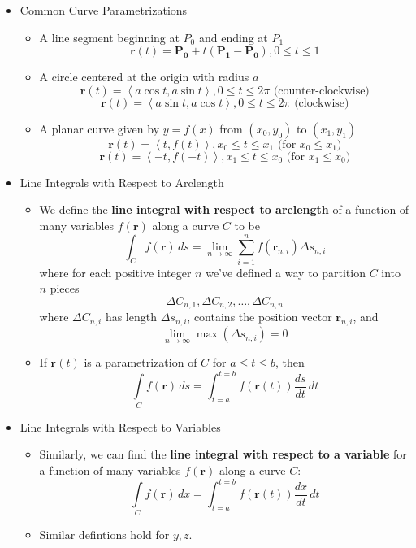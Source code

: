 \documentclass[12pt]{article}
\renewcommand{\vec}[1]{\mathbf{#1}}
\newcommand{\dvar}[1]{\,d{#1}}
\renewcommand{\d}[1]{\dvar{#1}}
\newcommand{\<}{\left<}
\renewcommand{\>}{\right>}
\begin{document}
  \begin{itemize}

  \item Common Curve Parametrizations

    \begin{itemize}
      \item A line segment beginning at $P_0$ and ending at $P_1$
        \[
          \vec{r}(t) = \vec{P_0} + t(\vec{P_1}-\vec{P_0}), 0\leq t\leq 1
        \]
      \item A circle centered at the origin with radius $a$
        \[
          \vec{r}(t) = \<a\cos t,a\sin t\>, 0\leq t\leq 2\pi \text{ (counter-clockwise)}
        \]
        \[
          \vec{r}(t) = \<a\sin t,a\cos t\>, 0\leq t\leq 2\pi \text{ (clockwise)}
        \]
      \item A planar curve given by $y=f(x)$ from $(x_0,y_0)$ to $(x_1,y_1)$
        \[
          \vec{r}(t) = \<t,f(t)\>, x_0\leq t\leq x_1 \text{ (for } x_0\leq x_1 \text{)}
        \]
        \[
          \vec{r}(t) = \<-t,f(-t)\>, x_1\leq t\leq x_0 \text{ (for } x_1\leq x_0 \text{)}
        \]
    \end{itemize}
  
  \item Line Integrals with Respect to Arclength
  
    \begin{itemize}
    \item We define the \textbf{line integral with respect to arclength} of a function of many variables $f(\vec{r})$ along a curve $C$ to be 
      \[
        \int_C f(\vec{r})\d{s} = \lim_{n\to\infty}\sum_{i=1}^n f(\vec{r}_{n,i})\Delta s_{n,i}
      \]
    where for each positive integer $n$ we've defined a way to partition $C$ into $n$ pieces 
      \[
        \Delta C_{n,1},\Delta C_{n,2},\dots,\Delta C_{n,n}
      \]
    where $\Delta C_{n,i}$ has length $\Delta s_{n,i}$, contains the position vector $\vec{r}_{n,i}$, and \[\lim_{n\to\infty} \max(\Delta s_{n,i}) = 0\]
    \item If $\vec{r}(t)$ is a parametrization of $C$ for $a \leq t \leq b$, then 
      \[
        \int\limits_C f(\vec{r})\dvar{s}=\int_{t=a}^{t=b} f(\vec{r}(t))\frac{ds}{dt}\d{t}
      \]
    \end{itemize}

  \newpage

  \item Line Integrals with Respect to Variables

    \begin{itemize}
    \item Similarly, we can find the \textbf{line integral with respect to a variable} for a function of many variables $f(\vec{r})$ along a curve $C$:
      \[
        \int\limits_C f(\vec{r})\dvar{x}=\int_{t=a}^{t=b} f(\vec{r}(t))\frac{dx}{dt}\d{t}
      \]
    \item Similar defintions hold for $y,z$.
    \end{itemize}


\end{itemize}
\end{document}
